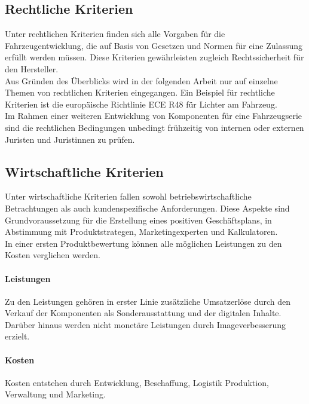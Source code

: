 \subsection{Rechtliche Kriterien}
Unter rechtlichen Kriterien finden sich alle Vorgaben für die Fahrzeugentwicklung, die auf Basis von Gesetzen und Normen für eine Zulassung erfüllt werden müssen. Diese Kriterien gewährleisten zugleich Rechtssicherheit für den Hersteller. \\
Aus Gründen des Überblicks wird in der folgenden Arbeit nur auf einzelne Themen von rechtlichen Kriterien eingegangen. 
Ein Beispiel für rechtliche Kriterien ist die europäische Richtlinie ECE R48 für Lichter am Fahrzeug. \cite[Vgl. Seite 1 ff.]{R48.2016} \\
Im Rahmen einer weiteren Entwicklung von Komponenten für eine Fahrzeugserie sind die rechtlichen Bedingungen unbedingt frühzeitig von internen oder externen Juristen und Juristinnen zu prüfen.
\subsection{Wirtschaftliche Kriterien}
Unter wirtschaftliche Kriterien fallen sowohl betriebswirtschaftliche Betrachtungen als auch kundenspezifische Anforderungen. Diese Aspekte sind Grundvoraussetzung für die Erstellung eines positiven Geschäftsplans, in Abstimmung mit Produktstrategen, Marketingexperten und Kalkulatoren. \\
In einer ersten Produktbewertung können alle möglichen Leistungen zu den Kosten verglichen werden.
\paragraph{Leistungen}
Zu den Leistungen gehören in erster Linie zusätzliche Umsatzerlöse durch den Verkauf der Komponenten als Sonderausstattung und der digitalen Inhalte. Darüber hinaus werden nicht monetäre Leistungen durch Imageverbesserung erzielt.
\paragraph{Kosten}
Kosten entstehen durch Entwicklung, Beschaffung, Logistik Produktion, Verwaltung und Marketing. 
